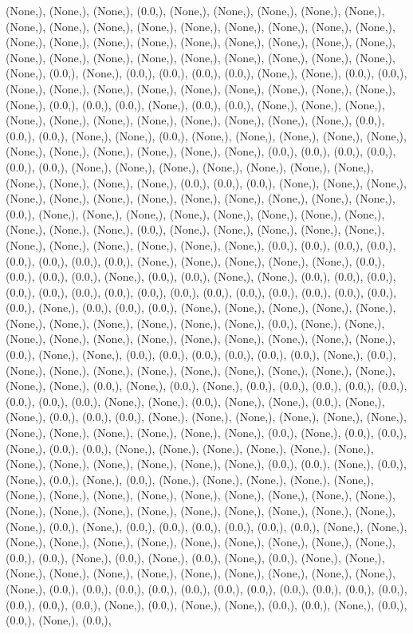 \documentclass{article}
\begin{document}
(None,), (None,), (None,), (0.0,), (None,), (None,), (None,), (None,), (None,), (None,), (None,), (None,), (None,), (None,), (None,), (None,), (None,), (None,), (None,), (None,), (None,), (None,), (None,), (None,), (None,), (None,), (None,), (None,), (None,), (None,), (None,), (None,), (None,), (None,), (None,), (None,), (None,), (0.0,), (None,), (0.0,), (0.0,), (0.0,), (0.0,), (None,), (None,), (0.0,), (0.0,), (None,), (None,), (None,), (None,), (None,), (None,), (None,), (None,), (None,), (None,), (0.0,), (0.0,), (0.0,), (None,), (0.0,), (0.0,), (None,), (None,), (None,), (None,), (None,), (None,), (None,), (None,), (None,), (None,), (None,), (0.0,), (0.0,), (0.0,), (None,), (None,), (0.0,), (None,), (None,), (None,), (None,), (None,), (None,), (None,), (None,), (None,), (None,), (None,), (0.0,), (0.0,), (0.0,), (0.0,), (0.0,), (0.0,), (None,), (None,), (None,), (None,), (None,), (None,), (None,), (None,), (None,), (None,), (None,), (0.0,), (0.0,), (0.0,), (None,), (None,), (None,), (None,), (None,), (None,), (None,), (None,), (None,), (None,), (None,), (None,), (0.0,), (None,), (None,), (None,), (None,), (None,), (None,), (None,), (None,), (None,), (None,), (None,), (0.0,), (None,), (None,), (None,), (None,), (None,), (None,), (None,), (None,), (None,), (None,), (None,), (0.0,), (0.0,), (0.0,), (0.0,), (0.0,), (0.0,), (0.0,), (0.0,), (None,), (None,), (None,), (None,), (None,), (0.0,), (0.0,), (0.0,), (0.0,), (None,), (0.0,), (0.0,), (None,), (None,), (0.0,), (0.0,), (0.0,), (0.0,), (0.0,), (0.0,), (0.0,), (0.0,), (0.0,), (0.0,), (0.0,), (0.0,), (0.0,), (0.0,), (0.0,), (0.0,), (None,), (0.0,), (0.0,), (0.0,), (None,), (None,), (None,), (None,), (None,), (None,), (None,), (None,), (None,), (None,), (None,), (0.0,), (None,), (None,), (None,), (None,), (None,), (None,), (None,), (None,), (None,), (None,), (None,), (0.0,), (None,), (None,), (0.0,), (0.0,), (0.0,), (0.0,), (0.0,), (0.0,), (None,), (0.0,), (None,), (None,), (None,), (None,), (None,), (None,), (None,), (None,), (None,), (None,), (None,), (0.0,), (None,), (0.0,), (None,), (0.0,), (0.0,), (0.0,), (0.0,), (0.0,), (0.0,), (0.0,), (0.0,), (None,), (None,), (0.0,), (None,), (None,), (0.0,), (None,), (None,), (0.0,), (0.0,), (0.0,), (None,), (None,), (None,), (None,), (None,), (None,), (None,), (None,), (None,), (None,), (None,), (None,), (0.0,), (None,), (0.0,), (0.0,), (None,), (0.0,), (0.0,), (None,), (None,), (None,), (None,), (None,), (None,), (None,), (None,), (None,), (None,), (None,), (None,), (0.0,), (0.0,), (None,), (0.0,), (None,), (0.0,), (None,), (0.0,), (None,), (None,), (None,), (None,), (None,), (None,), (None,), (None,), (None,), (None,), (None,), (None,), (None,), (None,), (None,), (None,), (None,), (None,), (None,), (None,), (None,), (None,), (None,), (None,), (0.0,), (None,), (0.0,), (0.0,), (0.0,), (0.0,), (0.0,), (0.0,), (None,), (None,), (None,), (None,), (None,), (None,), (None,), (None,), (None,), (None,), (None,), (0.0,), (0.0,), (None,), (0.0,), (None,), (0.0,), (None,), (0.0,), (None,), (None,), (None,), (None,), (None,), (None,), (None,), (None,), (None,), (None,), (None,), (None,), (0.0,), (0.0,), (0.0,), (0.0,), (0.0,), (0.0,), (0.0,), (0.0,), (0.0,), (0.0,), (0.0,), (0.0,), (0.0,), (0.0,), (None,), (0.0,), (None,), (None,), (0.0,), (0.0,), (None,), (0.0,), (0.0,), (None,), (0.0,), 
\end{document}
